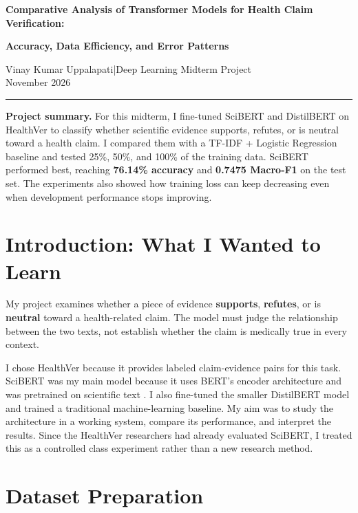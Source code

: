 \documentclass[11pt,letterpaper]{article}
\begin{document}
\begin{center}
{\Large\bfseries\color{navy} Comparative Analysis of Transformer Models for Health Claim Verification:\par}
\vspace{2pt}
{\large\bfseries\color{navy} Accuracy, Data Efficiency, and Error Patterns\par}
\vspace{8pt}
{Vinay Kumar Uppalapati}\quad |\quad Deep Learning Midterm Project\\
{\small November 2026}
\end{center}
\hrule\vspace{6pt}

\noindent\textbf{Project summary.} For this midterm, I fine-tuned SciBERT and DistilBERT on HealthVer to classify whether scientific evidence supports, refutes, or is neutral toward a health claim. I compared them with a TF-IDF + Logistic Regression baseline and tested 25\%, 50\%, and 100\% of the training data. SciBERT performed best, reaching \textbf{76.14\% accuracy} and \textbf{0.7475 Macro-F1} on the test set. The experiments also showed how training loss can keep decreasing even when development performance stops improving.

\section{Introduction: What I Wanted to Learn}
My project examines whether a piece of evidence \textbf{supports}, \textbf{refutes}, or is \textbf{neutral} toward a health-related claim. The model must judge the relationship between the two texts, not establish whether the claim is medically true in every context.

I chose HealthVer \cite{sarrouti} because it provides labeled claim-evidence pairs for this task. SciBERT was my main model because it uses BERT's encoder architecture and was pretrained on scientific text \cite{beltagy}. I also fine-tuned the smaller DistilBERT model and trained a traditional machine-learning baseline. My aim was to study the architecture in a working system, compare its performance, and interpret the results. Since the HealthVer researchers had already evaluated SciBERT, I treated this as a controlled class experiment rather than a new research method.

\section{Dataset Preparation}
\end{document}
